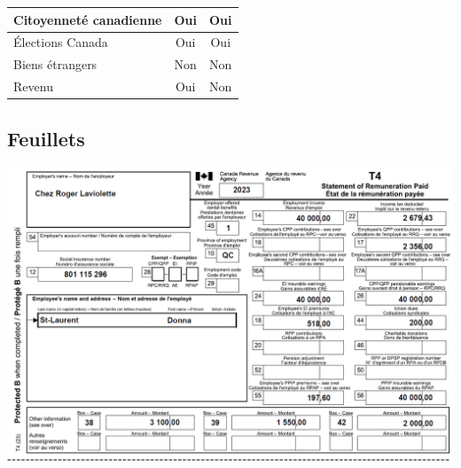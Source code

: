 \begin{center}
\begin{tabular}{|l|c|c|}
		Citoyenneté canadienne                     &           Oui           &           Oui            \\ \hline
		Élections Canada                           &           Oui           &           Oui            \\ \hline
		Biens étrangers                            &           Non           &           Non            \\ \hline
		Revenu                                     &           Oui           &           Non            \\ \hline
	\end{tabular}
\end{center}


\subsection{Feuillets}
\noindent
\includegraphics[width=\textwidth]{probleme/chapitre-3/T4.png}

